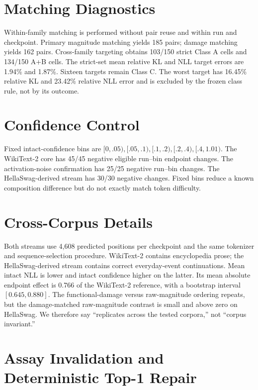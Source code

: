 \section{Matching Diagnostics}

Within-family matching is performed without pair reuse and within run and
checkpoint. Primary magnitude matching yields 185 pairs; damage matching yields
162 pairs. Cross-family targeting obtains 103/150 strict Class A cells and
134/150 A+B cells. The strict-set mean relative KL and NLL target errors are
1.94\% and 1.87\%. Sixteen targets remain Class C. The worst target has 16.45\%
relative KL and 23.42\% relative NLL error and is excluded by the frozen class
rule, not by its outcome.

\section{Confidence Control}

Fixed intact-confidence bins are
$[0,.05),[.05,.1),[.1,.2),[.2,.4),[.4,1.01)$. The
WikiText-2 core has 45/45 negative eligible run--bin endpoint changes. The
activation-noise confirmation has 25/25 negative run--bin changes. The
HellaSwag-derived stream has 30/30 negative changes. Fixed bins reduce a known
composition difference but do not exactly match token difficulty.

\section{Cross-Corpus Details}

Both streams use 4,608 predicted positions per checkpoint and the same
tokenizer and sequence-selection procedure. WikiText-2 contains encyclopedia
prose; the HellaSwag-derived stream contains correct everyday-event
continuations. Mean intact NLL is lower and intact confidence higher on the
latter. Its mean absolute endpoint effect is 0.766 of the WikiText-2 reference,
with a bootstrap interval $[0.645,0.880]$. The functional-damage versus
raw-magnitude ordering repeats, but the damage-matched raw-magnitude contrast
is small and above zero on HellaSwag. We therefore say “replicates across the
tested corpora,” not “corpus invariant.”

\section{Assay Invalidation and Deterministic Top-1 Repair}
\label{app:repair}

